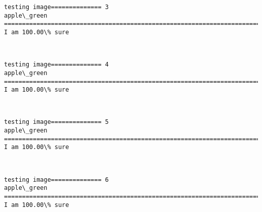 \documentclass[11pt]{article}
\begin{document}
    \begin{Verbatim}[commandchars=\\\{\}]
testing image============== 3
apple\_green
============================================================================
I am 100.00\% sure

    \end{Verbatim}

    \begin{center}
    \end{center}
    { \hspace*{\fill} \\}
    
    \begin{Verbatim}[commandchars=\\\{\}]
testing image============== 4
apple\_green
============================================================================
I am 100.00\% sure

    \end{Verbatim}

    \begin{center}
    \end{center}
    { \hspace*{\fill} \\}
    
    \begin{Verbatim}[commandchars=\\\{\}]
testing image============== 5
apple\_green
============================================================================
I am 100.00\% sure

    \end{Verbatim}

    \begin{center}
    \end{center}
    { \hspace*{\fill} \\}
    
    \begin{Verbatim}[commandchars=\\\{\}]
testing image============== 6
apple\_green
============================================================================
I am 100.00\% sure

    \end{Verbatim}
\end{document}
